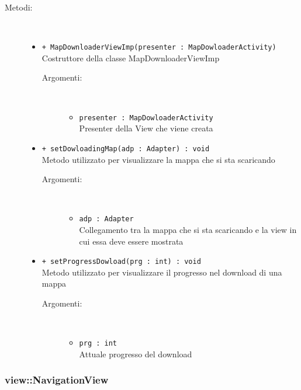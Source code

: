\documentclass[../DefinizioneDiProdotto.tex]{subfiles}
\begin{document}
\begin{description}
\begin{itemize}
\end{itemize}
\item[Metodi:] \
\begin{itemize}
\item \texttt{+ MapDownloaderViewImp(presenter : MapDowloaderActivity)}\\
Costruttore della classe MapDownloaderViewImp
 \begin{description}
\item[Argomenti:] \
\begin{itemize}
\item \texttt{presenter : MapDowloaderActivity}\\
Presenter della View che viene creata\end{itemize}
\end{description}
\item \texttt{+ setDowloadingMap(adp : Adapter) : void}\\
Metodo utilizzato per visualizzare la mappa che si sta scaricando
 \begin{description}
\item[Argomenti:] \
\begin{itemize}
\item \texttt{adp : Adapter}\\
Collegamento tra la mappa che si sta scaricando e la view in cui essa deve essere mostrata\end{itemize}
\end{description}
\item \texttt{+ setProgressDowload(prg : int) : void}\\
Metodo utilizzato per visualizzare il progresso nel download di una mappa
 \begin{description}
\item[Argomenti:] \
\begin{itemize}
\item \texttt{prg : int}\\
Attuale progresso del download\end{itemize}
\end{description}
\end{itemize}
\end{description}

\subsubsection{view::NavigationView}
\end{document}

